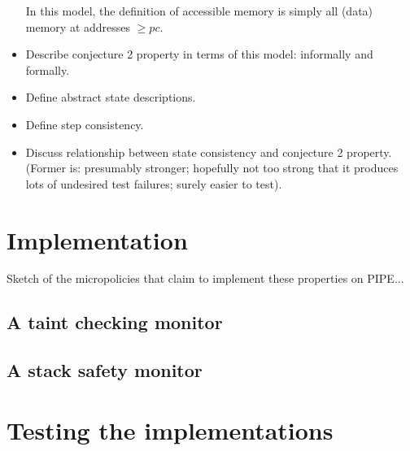 \documentclass[conference]{IEEEtran}
\newif\iftext \textfalse
\begin{document}
\begin{itemize}
\begin {itemize}
  \end {itemize}
  In this model, the definition of accessible memory is simply all (data) memory at addresses $\geq pc$. 
\item
  Describe conjecture 2 property in terms of this model: informally and formally.
\item
  Define abstract state descriptions.
\item
  Define step consistency.
\item
  Discuss relationship between state consistency and conjecture 2 property.  (Former is: presumably stronger; hopefully not
  too strong that it produces lots of undesired test failures; surely easier to test).

\end{itemize}







\iftext
\section{Stack + heap protection too}

POTENTIALLY: Memory safety (before stack) + Conjunction of memory + stack
safety (after).

(Memory safety by itself is just arthur’s paper, but it’s cool to see how
they are combined, especially what bits can be factored out as common
structure, e.g. the notion of accessibility)
\fi

\section{Implementation}
\label{impl}

Sketch of the micropolicies that claim to implement these properties on
PIPE...

\subsection{A taint checking monitor}

\subsection{A stack safety monitor}

\section{Testing the implementations}
\end{document}
